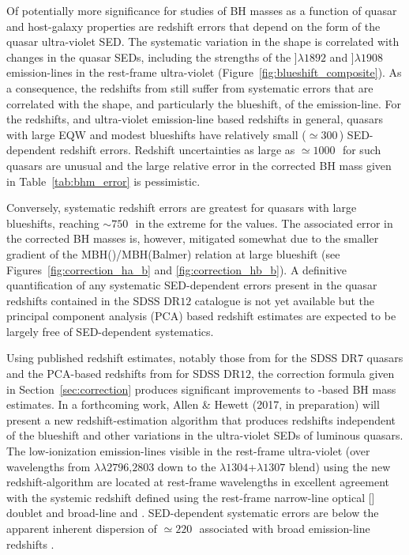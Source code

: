 Of potentially more significance for studies of BH masses as a function of quasar and host-galaxy properties are redshift errors that depend on the form of the quasar ultra-violet SED.
The systematic variation in the  shape is correlated with changes in the quasar SEDs, including the strengths of the ]$\lambda$$1892$ and ]$\lambda$$1908$ emission-lines in the rest-frame ultra-violet (Figure~\ref{fig:blueshift_composite}). 
As a consequence, the redshifts from \citet{hewett10} still suffer from systematic errors that are correlated with the shape, and particularly the blueshift, of the  emission-line.
For the \citet{hewett10} redshifts, and ultra-violet emission-line based redshifts in general, quasars with large  EQW and modest blueshifts have relatively small ($\simeq300$\,\kms) SED-dependent redshift errors.
Redshift uncertainties as large as $\simeq1000$\,\kms\, for such quasars are unusual and the large relative error in the corrected  BH mass given in Table~\ref{tab:bhm_error} is pessimistic. 

Conversely, systematic redshift errors are greatest for quasars with large blueshifts, reaching $\sim750$\,\kms\, in the extreme for the \citet{hewett10} values. 
The associated error in the corrected  BH masses is, however, mitigated somewhat due to the smaller gradient of the MBH()/MBH(Balmer) relation at large  blueshift (see Figures~\ref{fig:correction_ha_b} and \ref{fig:correction_hb_b}). 
A definitive quantification of any systematic SED-dependent errors present in the quasar redshifts contained in the SDSS DR$12$ catalogue is not yet available but the principal component analysis (PCA) based redshift estimates are expected to be largely free of SED-dependent systematics. 

Using published redshift estimates, notably those from \citet{hewett10} for the SDSS DR$7$ quasars and the PCA-based redshifts from \citet{paris17} for SDSS DR$12$, the correction formula given in Section~\ref{sec:correction} produces significant improvements to -based BH mass estimates.
In a forthcoming work, Allen \& Hewett (2017, in preparation) will present a new redshift-estimation algorithm that produces redshifts independent of the  blueshift and other variations in the ultra-violet SEDs of luminous quasars.
The low-ionization emission-lines visible in the rest-frame ultra-violet (over wavelengths from $\lambda\lambda$$2796$,$2803$ down to the $\lambda$$1304$+$\lambda$$1307$ blend) using the new redshift-algorithm are located at rest-frame wavelengths in excellent agreement with the systemic redshift defined using the rest-frame narrow-line optical [] doublet and broad-line \hb and \hans.
SED-dependent systematic errors are below the apparent inherent dispersion of $\simeq220$\,\kms\, associated with broad emission-line redshifts \citep{shen16b}.

